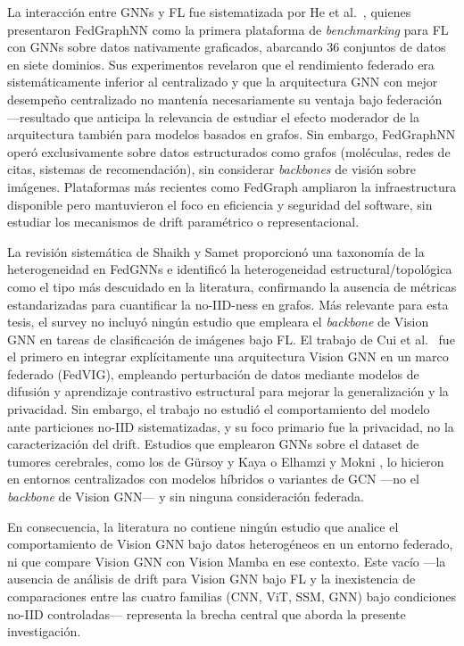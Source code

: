 La interacción entre GNNs y FL fue sistematizada por He et al.\ \cite{DBLP:journals/corr/abs-2104-07145},
quienes presentaron FedGraphNN como la primera plataforma de \textit{benchmarking} para FL con
GNNs sobre datos nativamente graficados, abarcando 36 conjuntos de datos en siete dominios.
Sus experimentos revelaron que el rendimiento federado era sistemáticamente inferior al centralizado
y que la arquitectura GNN con mejor desempeño centralizado no mantenía necesariamente su ventaja
bajo federación ---resultado que anticipa la relevancia de estudiar el efecto moderador de la
arquitectura también para modelos basados en grafos.
Sin embargo, FedGraphNN operó exclusivamente sobre datos estructurados como grafos (moléculas,
redes de citas, sistemas de recomendación), sin considerar \textit{backbones} de visión sobre
imágenes.
Plataformas más recientes como FedGraph \cite{yao2024fedgraph} ampliaron la infraestructura
disponible pero mantuvieron el foco en eficiencia y seguridad del software, sin estudiar los
mecanismos de drift paramétrico o representacional.

La revisión sistemática de Shaikh y Samet \cite{shaikh2025federated} proporcionó una taxonomía
de la heterogeneidad en FedGNNs e identificó la heterogeneidad estructural/topológica como el
tipo más descuidado en la literatura, confirmando la ausencia de métricas estandarizadas para
cuantificar la no-IID-ness en grafos.
Más relevante para esta tesis, el survey no incluyó ningún estudio que empleara el \textit{backbone}
de Vision GNN en tareas de clasificación de imágenes bajo FL.
El trabajo de Cui et al.\ \cite{cui2025fedvig} fue el primero en integrar explícitamente una
arquitectura Vision GNN en un marco federado (FedVIG), empleando perturbación de datos mediante
modelos de difusión y aprendizaje contrastivo estructural para mejorar la generalización y la
privacidad.
Sin embargo, el trabajo no estudió el comportamiento del modelo ante particiones no-IID
sistematizadas, y su foco primario fue la privacidad, no la caracterización del drift.
Estudios que emplearon GNNs sobre el dataset de tumores cerebrales, como los de Gürsoy y Kaya
\cite{gursoy2024brain} o Elhamzi y Mokni \cite{elhamzi2026braingraphnet}, lo hicieron en entornos
centralizados con modelos híbridos o variantes de GCN ---no el \textit{backbone} de Vision GNN---
y sin ninguna consideración federada.

En consecuencia, la literatura no contiene ningún estudio que analice el comportamiento de Vision
GNN bajo datos heterogéneos en un entorno federado, ni que compare Vision GNN con Vision Mamba
en ese contexto.
Este vacío ---la ausencia de análisis de drift para Vision GNN bajo FL y la inexistencia de
comparaciones entre las cuatro familias (CNN, ViT, SSM, GNN) bajo condiciones no-IID controladas---
representa la brecha central que aborda la presente investigación.


